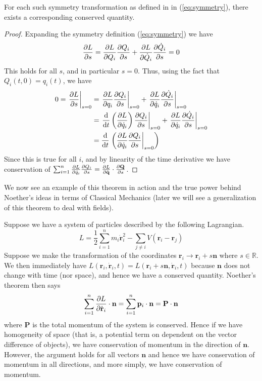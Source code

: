 \begin{theorem}\label{noetherian}
For each such symmetry transformation as defined in in (\ref{eq:symmetry}), there exists a corresponding conserved quantity.
\end{theorem}
\begin{proof}
Expanding the symmetry definition (\ref{eq:symmetry}) we have
\begin{equation}
\pdv{L}{s} = \pdv{L}{Q_i}\pdv{Q_i}{s} + \pdv{L}{\dot{Q}_i}\pdv{\dot{Q}_i}{s} = 0
\end{equation}
This holds for all $s$, and in particular $s = 0$. Thus, using the fact that $Q_i(t,0) = q_i(t)$, we have
\begin{align}
0 = \left.\pdv{L}{s}\right|_{s = 0} & = \left.\pdv{L}{q_i}\pdv{Q_i}{s}\right|_{s = 0} + \left.\pdv{L}{\dot{q}_i}\pdv{ \dot{Q}_i}{s}\right|_{s = 0} \\
 & = \left.\dv{t}\left(\pdv{L}{\dot{q}_i}\right)\pdv{Q_i}{s}\right|_{s = 0} + \left.\pdv{L}{\dot{q}_i}\pdv{\dot{Q}_i}{s}\right|_{s = 0} \\
 & = \dv{t}\left.\left(\pdv{L}{\dot{q}_i}\pdv{Q_i}{s}\right|_{s = 0}\right)
\end{align}
Since this is true for all $i$, and by linearity of the time derivative we have conservation of $\sum_{i = 1}^n \pdv{L}{\dot{q}_i}\pdv{Q_i}{s} = \pdv{L}{\dot{\mathbf{q}}}\cdot\pdv{\mathbf{Q}}{s}$.
\end{proof}
We now see an example of this theorem in action and the true power behind Noether's ideas in terms of Classical Mechanics (later we will see a generalization of this theorem to deal with fields).
\begin{example}\label{momcons}
Suppose we have a system of particles described by the following Lagrangian.
\begin{equation}
L = \frac{1}{2}\sum_{i = 1}^n m_i\dot{\mathbf{r}}_i^2 - \sum_{j\neq i}V(\mathbf{r}_i - \mathbf{r}_j)
\end{equation}
Suppose we make the transformation of the coordinates $\mathbf{r}_i\to \mathbf{r}_i + s\mathbf{n}$ where $s\in\mathbb{R}$. We then immediately have $L(\mathbf{r}_i, \dot{\mathbf{r}}_i, t) = L(\mathbf{r}_i + s\mathbf{n}, \dot{\mathbf{r}}_i, t)$ because $\mathbf{n}$ does not change with time (nor space), and hence we have a conserved quantity. Noether's theorem then says
\begin{equation}
\sum_{i = 1}^n\pdv{L}{\dot{\mathbf{r}}_i}\cdot\mathbf{n} = 
\sum_{i = 1}^n \mathbf{p}_i\cdot\mathbf{n} = \mathbf{P}\cdot\mathbf{n}
\end{equation}
where $\mathbf{P}$ is the total momentum of the system is conserved. Hence if we have homogeneity of space (that is, a potential term on dependent on the vector difference of objects), we have conservation of momentum in the direction of $\mathbf{n}$. However, the argument holds for all vectors $\mathbf{n}$ and hence we have conservation of momentum in all directions, and more simply, we have conservation of momentum.
\end{example}
